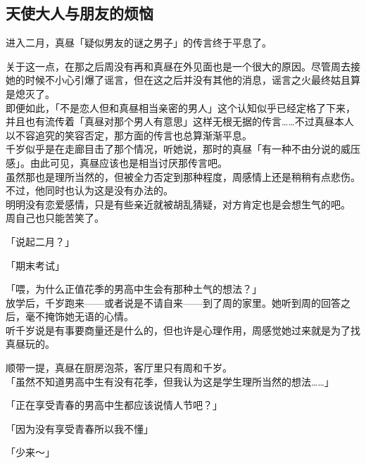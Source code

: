 \subsection{天使大人与朋友的烦恼}

进入二月，真昼「疑似男友的谜之男子」的传言终于平息了。

关于这一点，在那之后周没有再和真昼在外见面也是一个很大的原因。尽管周去接她的时候不小心引爆了谣言，但在这之后并没有其他的消息，谣言之火最终姑且算是熄灭了。\\

即便如此，「不是恋人但和真昼相当亲密的男人」这个认知似乎已经定格了下来，并且也有流传着「真昼对那个男人有意思」这样无根无据的传言……不过真昼本人以不容追究的笑容否定，那方面的传言也总算渐渐平息。\\

千岁似乎是在走廊目击了那个情况，听她说，那时的真昼「有一种不由分说的威压感」。由此可见，真昼应该也是相当讨厌那传言吧。\\

虽然那也是理所当然的，但被全力否定到那种程度，周感情上还是稍稍有点悲伤。不过，他同时也认为这是没有办法的。\\

明明没有恋爱感情，只是有些亲近就被胡乱猜疑，对方肯定也是会想生气的吧。\\

周自己也只能苦笑了。\\

\vspace{2\baselineskip}

「说起二月？」

「期末考试」

「喂，为什么正值花季的男高中生会有那种土气的想法？」\\

放学后，千岁跑来——或者说是不请自来——到了周的家里。她听到周的回答之后，毫不掩饰她无语的心情。\\

听千岁说是有事要商量还是什么的，但也许是心理作用，周感觉她过来就是为了找真昼玩的。

顺带一提，真昼在厨房泡茶，客厅里只有周和千岁。\\

「虽然不知道男高中生有没有花季，但我认为这是学生理所当然的想法……」

「正在享受青春的男高中生都应该说情人节吧？」

「因为没有享受青春所以我不懂」

「少来～」\\

